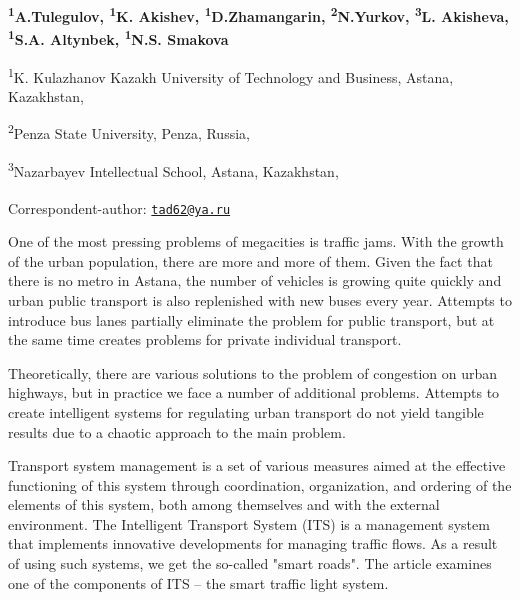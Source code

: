 
\begin{articleheader}

{\bfseries \textsuperscript{1}A.Tulegulov\textsuperscript{\envelope },
\textsuperscript{1}K. Akishev, \textsuperscript{1}D.Zhamangarin,
\textsuperscript{2}N.Yurkov, \textsuperscript{3}L. Akisheva, \textsuperscript{1}S.A. Altynbek, \textsuperscript{1}N.S. Smakova}
\end{articleheader}

\begin{affiliation}
\textsuperscript{1}K. Kulazhanov Kazakh University of Technology and
Business, Astana, Kazakhstan,

\textsuperscript{2}Penza State University, Penza, Russia,

\textsuperscript{3}Nazarbayev Intellectual School, Astana, Kazakhstan,

\raggedright {\bfseries \textsuperscript{\envelope }}Correspondent-author: \href{mailto:tad62@ya.ru}{\nolinkurl{tad62@ya.ru}}
\end{affiliation}

One of the most pressing problems of megacities is traffic jams. With
the growth of the urban population, there are more and more of them.
Given the fact that there is no metro in Astana, the number of vehicles
is growing quite quickly and urban public transport is also replenished
with new buses every year. Attempts to introduce bus lanes partially
eliminate the problem for public transport, but at the same time creates
problems for private individual transport.

Theoretically, there are various solutions to the problem of congestion
on urban highways, but in practice we face a number of additional
problems. Attempts to create intelligent systems for regulating urban
transport do not yield tangible results due to a chaotic approach to the
main problem.

Transport system management is a set of various measures aimed at the
effective functioning of this system through coordination, organization,
and ordering of the elements of this system, both among themselves and
with the external environment. The Intelligent Transport System (ITS) is
a management system that implements innovative developments for managing
traffic flows. As a result of using such systems, we get the so-called
"smart roads". The article examines one of the components of ITS -- the
smart traffic light system.

